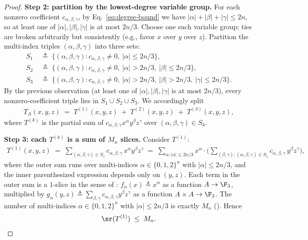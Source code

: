 \begin{proof}
\textbf{Step 2: partition by the lowest-degree variable group.} For each nonzero coefficient $c_{\alpha, \beta, \gamma}$, by Eq.~\eqref{eq:degree-bound} we have $|\alpha| + |\beta| + |\gamma| \le 2n$, so at least one of $|\alpha|, |\beta|, |\gamma|$ is at most $2n/3$. Choose one such variable group; ties are broken arbitrarily but consistently (e.g., favor $x$ over $y$ over $z$). Partition the multi-index triples $(\alpha, \beta, \gamma)$ into three sets:
\begin{align*}
S_1 &\;\triangleq\; \{(\alpha, \beta, \gamma) : c_{\alpha, \beta, \gamma} \ne 0, \ |\alpha| \le 2n/3\}, \\
S_2 &\;\triangleq\; \{(\alpha, \beta, \gamma) : c_{\alpha, \beta, \gamma} \ne 0, \ |\alpha| > 2n/3, \ |\beta| \le 2n/3\}, \\
S_3 &\;\triangleq\; \{(\alpha, \beta, \gamma) : c_{\alpha, \beta, \gamma} \ne 0, \ |\alpha| > 2n/3, \ |\beta| > 2n/3, \ |\gamma| \le 2n/3\}.
\end{align*}
By the previous observation (at least one of $|\alpha|, |\beta|, |\gamma|$ is at most $2n/3$), every nonzero-coefficient triple lies in $S_1 \cup S_2 \cup S_3$. We accordingly split
\begin{align}\label{eq:split-three}
T_A(x, y, z) \;=\; T^{(1)}(x, y, z) \;+\; T^{(2)}(x, y, z) \;+\; T^{(3)}(x, y, z),
\end{align}
where $T^{(k)}$ is the partial sum of $c_{\alpha, \beta, \gamma} x^{\alpha} y^{\beta} z^{\gamma}$ over $(\alpha, \beta, \gamma) \in S_k$.

\textbf{Step 3: each $T^{(k)}$ is a sum of $M_n$ slices.} Consider $T^{(1)}$:
\begin{align*}
T^{(1)}(x, y, z)
\;=\; \sum_{(\alpha, \beta, \gamma) \in S_1} c_{\alpha, \beta, \gamma} \, x^{\alpha} y^{\beta} z^{\gamma}
\;=\; \sum_{\alpha : |\alpha| \le 2n/3} x^{\alpha} \cdot \Big( \sum_{(\beta, \gamma) : (\alpha, \beta, \gamma) \in S_1} c_{\alpha, \beta, \gamma} \, y^{\beta} z^{\gamma} \Big),
\end{align*}
where the outer sum runs over multi-indices $\alpha \in \{0,1,2\}^n$ with $|\alpha| \le 2n/3$, and the inner parenthesized expression depends only on $(y, z)$. Each term in the outer sum is a $1$-slice in the sense of : $f_\alpha(x) \triangleq x^{\alpha}$ as a function $A \to \F_3$, multiplied by $g_\alpha(y, z) \triangleq \sum_{\beta, \gamma} c_{\alpha, \beta, \gamma} y^{\beta} z^{\gamma}$ as a function $A \times A \to \F_3$. The number of multi-indices $\alpha \in \{0,1,2\}^n$ with $|\alpha| \le 2n/3$ is exactly $M_n$ (). Hence
\begin{align}\label{eq:T1-bound}
\sr(T^{(1)}) \;\le\; M_n.
\end{align}


\end{proof}

